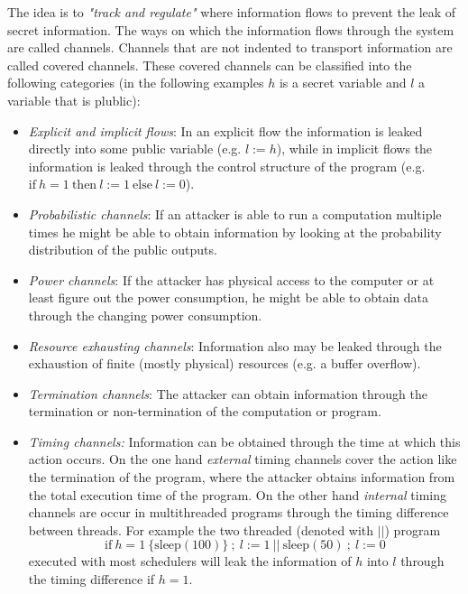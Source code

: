 \documentclass[a4paper,10pt]{llncs}
\begin{document}
The idea is to \textit{"track and regulate"}\cite{Zdancewic04} where information flows to
prevent the leak of secret information. The ways on which the information flows
through the system are called channels. Channels that are not indented to transport
information are called covered channels. These covered channels can
be classified into the following categories \cite{Sabelfeld03} (in the following examples $h$ is a secret
variable and $l$ a variable that is plublic):

\begin{itemize}
\item \textit{Explicit and implicit flows}: In an explicit flow the information is leaked
      directly into some public variable (e.g. $l := h$), while in implicit flows the information
      is leaked through the control structure of the program (e.g. $\text{if}\ h = 1\ \text{then}\ l := 1\ \text{else}\ l := 0$).
\item \textit{Probabilistic channels}: If an attacker is able to run a computation multiple times
      he might be able to obtain information by looking at the probability distribution of the
      public outputs.
\item \textit{Power channels}: If the attacker has physical access to the computer or at least figure out
      the power consumption, he might be able to obtain data through the changing power consumption.
\item \textit{Resource exhausting channels}: Information also may be leaked through the exhaustion
      of finite (mostly physical) resources (e.g. a buffer overflow).
\item \textit{Termination channels}: The attacker can obtain information through the termination
      or non-termination of the computation or program.
\item \textit{Timing channels:} Information can be obtained through the time at which this action
      occurs. On the one hand \textit{external} timing channels cover the action like the termination
      of the program, where the attacker obtains information from the total execution time of the program.
      On the other hand \textit{internal} timing channels are occur in multithreaded programs through the timing difference
      between threads. For example the two threaded (denoted with $||$) program \[\text{if}\ h = 1\ \{\text{sleep}(100)\}\ ;\ l := 1\ ||\ \text{sleep}(50)\ ;\ l := 0\]
      executed with most schedulers will leak the information of $h$ into $l$ through the timing difference
      if $h = 1$.
\end{itemize}
\end{document}

